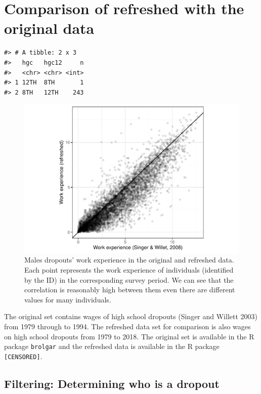 \documentclass{article}
\begin{document}
\hypertarget{compare}{%
\section{Comparison of refreshed with the original data}\label{compare}}

\begin{verbatim}
#> # A tibble: 2 x 3
#>   hgc   hgc12     n
#>   <chr> <chr> <int>
#> 1 12TH  8TH       1
#> 2 8TH   12TH    243
\end{verbatim}

\begin{figure}

{\centering \includegraphics[width=0.7\linewidth]{figures/compare-xp-sw-1} 

}

\caption{Males dropouts' work experience in the original and refreshed data. Each point represents the work experience of individuals (identified by the ID) in the corresponding survey period. We can see that the correlation is reasonably high between them even there are different values for many individuals.}\label{fig:compare-xp-sw}
\end{figure}

The original set contains wages of high school dropouts (Singer and Willett 2003) from 1979 through to 1994. The refreshed data set for comparison is also wages on high school dropouts from 1979 to 2018. The original set is available in the R package \texttt{brolgar} and the refreshed data is available in the R package \texttt{[CENSORED]}.

\hypertarget{filtering-determining-who-is-a-dropout}{%
\subsection{Filtering: Determining who is a dropout}\label{filtering-determining-who-is-a-dropout}}
\end{document}
